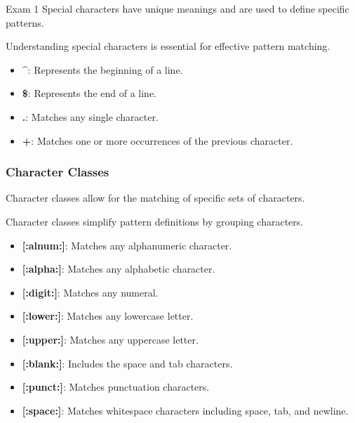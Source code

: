 \begin{examnotes}{Exam 1}
    Special characters have unique meanings and are used to define specific patterns.

    \begin{highlight}
        Understanding special characters is essential for effective pattern matching.
        
        \begin{itemize}
            \item \textbf{\^{}}: Represents the beginning of a line.
            \item \textbf{\$}: Represents the end of a line.
            \item \textbf{.}: Matches any single character.
            \item \textbf{+}: Matches one or more occurrences of the previous character.
        \end{itemize}
    \end{highlight}

    \subsubsection*{Character Classes}

    Character classes allow for the matching of specific sets of characters.

    \begin{highlight}
        Character classes simplify pattern definitions by grouping characters.
        
        \begin{itemize}
            \item \textbf{[:alnum:]}: Matches any alphanumeric character.
            \item \textbf{[:alpha:]}: Matches any alphabetic character.
            \item \textbf{[:digit:]}: Matches any numeral.
            \item \textbf{[:lower:]}: Matches any lowercase letter.
            \item \textbf{[:upper:]}: Matches any uppercase letter.
            \item \textbf{[:blank:]}: Includes the space and tab characters.
            \item \textbf{[:punct:]}: Matches punctuation characters.
            \item \textbf{[:space:]}: Matches whitespace characters including space, tab, and newline.
        \end{itemize}
    \end{highlight}


\end{examnotes}
